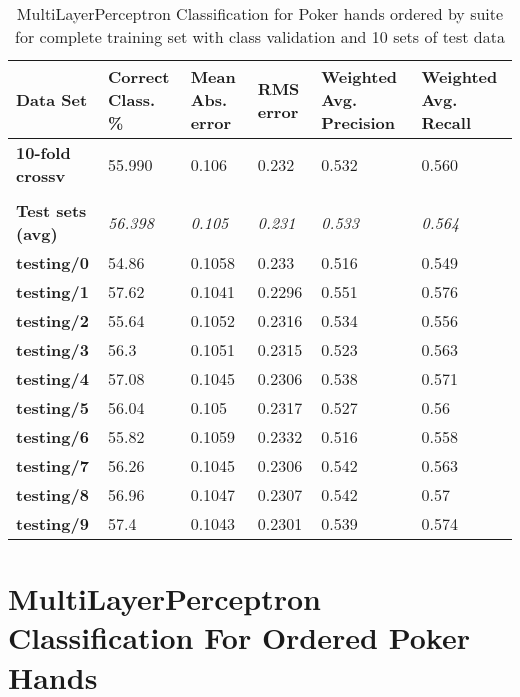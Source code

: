 \documentclass[10pt, a4paper]{article}
\begin{document}
\begin{table}[htbp]
  \centering
  \begin{tabular}{p{3cm}p{1.5cm}p{1.5cm}p{1.5cm}p{1.5cm}p{1.5cm}}
    \toprule
    \textbf{Data Set} & Correct Class. \% & Mean Abs. error & RMS error & Weighted Avg. Precision & Weighted Avg. Recall \\
    \midrule
    \textbf{10-fold crossv} & 55.990 & 0.106 & 0.232 & 0.532 & 0.560 \\
    \textbf{} &       &       &       &       &  \\
    \textbf{Test sets (avg)} & \textit{56.398} & \textit{0.105} & \textit{0.231} & \textit{0.533} & \textit{0.564} \\
    \textbf{   testing/0} & 54.86 & 0.1058 & 0.233 & 0.516 & 0.549 \\
    \textbf{   testing/1} & 57.62 & 0.1041 & 0.2296 & 0.551 & 0.576 \\
    \textbf{   testing/2} & 55.64 & 0.1052 & 0.2316 & 0.534 & 0.556 \\
    \textbf{   testing/3} & 56.3  & 0.1051 & 0.2315 & 0.523 & 0.563 \\
    \textbf{   testing/4} & 57.08 & 0.1045 & 0.2306 & 0.538 & 0.571 \\
    \textbf{   testing/5} & 56.04 & 0.105 & 0.2317 & 0.527 & 0.56 \\
    \textbf{   testing/6} & 55.82 & 0.1059 & 0.2332 & 0.516 & 0.558 \\
    \textbf{   testing/7} & 56.26 & 0.1045 & 0.2306 & 0.542 & 0.563 \\
    \textbf{   testing/8} & 56.96 & 0.1047 & 0.2307 & 0.542 & 0.57 \\
    \textbf{   testing/9} & 57.4  & 0.1043 & 0.2301 & 0.539 & 0.574 \\
    \bottomrule
    \end{tabular}%


	\caption{MultiLayerPerceptron Classification for Poker hands ordered by suite for complete training set with class validation and 10 sets of test data}   
  \label{tab:mlpsresults}%
\end{table}%

\clearpage

\section{MultiLayerPerceptron Classification For Ordered Poker Hands}
\label{app:neural}
\end{document}
